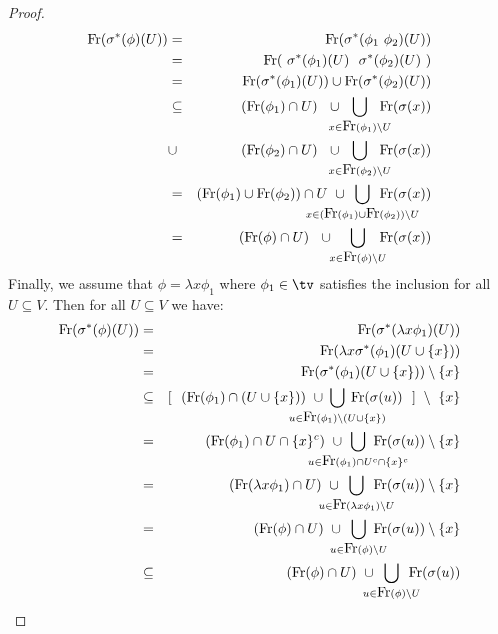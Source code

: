 \begin{proof}
\begin{eqnarray*}
        \free(\sigma^{*}(\phi)(U))
        &=&\free(\sigma^{*}(\phi_{1}\ \phi_{2})(U))\\
        &=&\free(\ \sigma^{*}(\phi_{1})(U)\ \ \sigma^{*}(\phi_{2})(U)\ )\\
        &=&\free(\sigma^{*}(\phi_{1})(U))\cup\free(\sigma^{*}(\phi_{2})(U))\\
        &\subseteq&(\free(\phi_{1})\cap U)\ \ \cup 
            \!\!\!\!\!\!\bigcup_{x\in\free(\phi_{1})\setminus U}\!\!\!\!\!\!
            \free(\sigma(x))\\
        &\cup&(\free(\phi_{2})\cap U)\ \ \cup
            \!\!\!\!\!\!\bigcup_{x\in\free(\phi_{2})\setminus U}\!\!\!\!\!\!
            \free(\sigma(x))\\
        &=&(\free(\phi_{1})\cup\free(\phi_{2}))\cap U
        \ \cup
        \!\!\!\!\!\!\!\!\!\!\!\!\!\!\!\!\!\!
        \bigcup_{x\in(\free(\phi_{1})\cup\free(\phi_{2}))\setminus U}
        \!\!\!\!\!\!\!\!\!\!\!\!\!\!\!\!\!\!
        \free(\sigma(x))\\
        &=&(\free(\phi)\cap U)\ \ \cup\ 
        \!\!\!\!\bigcup_{x\in\free(\phi)\setminus U}\!\!\!\!
            \free(\sigma(x))
    \end{eqnarray*}
Finally, we assume that $\phi=\lambda x\phi_{1}$ where $\phi_{1}\in\tv$ 
satisfies the inclusion for all $U\subseteq V$. Then for all $U\subseteq V$ 
we have:
    \begin{eqnarray*}
        \free(\sigma^{*}(\phi)(U))
        &=&\free(\sigma^{*}(\lambda x\phi_{1})(U))\\
        &=&\free(\lambda x\sigma^{*}(\phi_{1})(U\cup\{x\}))\\
        &=&\free(\sigma^{*}(\phi_{1})(U\cup\{x\}))\setminus\{x\}\\
        &\subseteq& [\ \ (\free(\phi_{1})\cap(U\cup\{x\}))
            \ \cup
            \!\!\!\!\!\!\!\!\!\!\!\!\!\!\!\!
            \bigcup_{u\in\free(\phi_{1})\setminus(U\cup\{x\})}
            \!\!\!\!\!\!\!\!\!\!\!\!\!\!\!\!
            \free(\sigma(u))
             \ \ ]\ \setminus\ \{x\}\\
        &=&(\free(\phi_{1})\cap U\cap \{x\}^{c})
            \ \cup
            \!\!\!\!\!\!\!\!\!\!\!\!\!\!\!\!
            \bigcup_{u\in\free(\phi_{1})\cap U^{c}\cap\{x\}^{c}}
            \!\!\!\!\!\!\!\!\!\!\!\!\!\!\!\!
            \free(\sigma(u))\setminus\{x\}\\
        &=&(\free(\lambda x\phi_{1})\cap U)
            \ \cup 
            \!\!\!\!\!\!\!\!\!\!
            \bigcup_{u\in\free(\lambda x\phi_{1})\setminus U}
            \!\!\!\!\!\!\!\!\!\!
            \free(\sigma(u))\setminus\{x\}\\
        &=&(\free(\phi)\cap U)
            \ \cup\ 
            \!\!\!\!\!\!\!\!
            \bigcup_{u\in\free(\phi)\setminus U} 
            \!\!\!\!\!\!\!
            \free(\sigma(u))\setminus\{x\}\\
        &\subseteq&(\free(\phi)\cap U)
            \ \cup\ 
            \!\!\!\!\!\!\!\!
            \bigcup_{u\in\free(\phi)\setminus U}
            \!\!\!\!\!\!
            \free(\sigma(u))
    \end{eqnarray*}
\end{proof}

